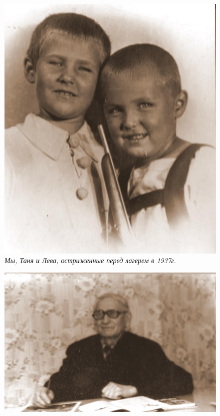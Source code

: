 \documentclass[utf8x, 12pt]{G7-32a} %
\begin{document}
\vspace{20pt}
\noindent
\begin{figure}[h!]
    \begin{minipage}[h!]{45mm}
        \includegraphics[width=\linewidth]{inc/Menshekovy/men21.JPG}
        \itshape{Мы, Таня и Лева, остриженные перед лагерем в 1937г.}
    \end{minipage}
    \hfill
   \begin{minipage}[h]{85mm}
       \includegraphics[width=\linewidth]{inc/Menshekovy/22.jpg} 

\end{minipage}
\end{figure}
\end{document}
